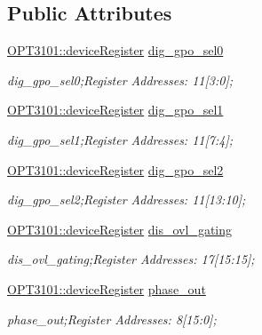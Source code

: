\subsection*{Public Attributes}
\begin{DoxyCompactItemize}
\item 
\mbox{\hyperlink{class_o_p_t3101_1_1device_register}{O\+P\+T3101\+::device\+Register}} \mbox{\hyperlink{class_o_p_t3101_1_1registers_a524961a20bb991dfedd371ad04106acb}{dig\+\_\+gpo\+\_\+sel0}}
\begin{DoxyCompactList}\small\item\em dig\+\_\+gpo\+\_\+sel0;Register Addresses\+: 11\mbox{[}3\+:0\mbox{]}; \end{DoxyCompactList}\item 
\mbox{\hyperlink{class_o_p_t3101_1_1device_register}{O\+P\+T3101\+::device\+Register}} \mbox{\hyperlink{class_o_p_t3101_1_1registers_aa4838268aa3b89fbd6e03d9f132072bb}{dig\+\_\+gpo\+\_\+sel1}}
\begin{DoxyCompactList}\small\item\em dig\+\_\+gpo\+\_\+sel1;Register Addresses\+: 11\mbox{[}7\+:4\mbox{]}; \end{DoxyCompactList}\item 
\mbox{\hyperlink{class_o_p_t3101_1_1device_register}{O\+P\+T3101\+::device\+Register}} \mbox{\hyperlink{class_o_p_t3101_1_1registers_a2274058727c99614f1eccf195ddccd6d}{dig\+\_\+gpo\+\_\+sel2}}
\begin{DoxyCompactList}\small\item\em dig\+\_\+gpo\+\_\+sel2;Register Addresses\+: 11\mbox{[}13\+:10\mbox{]}; \end{DoxyCompactList}\item 
\mbox{\hyperlink{class_o_p_t3101_1_1device_register}{O\+P\+T3101\+::device\+Register}} \mbox{\hyperlink{class_o_p_t3101_1_1registers_a258c4f416a6c31685b3e66f1d75921e7}{dis\+\_\+ovl\+\_\+gating}}
\begin{DoxyCompactList}\small\item\em dis\+\_\+ovl\+\_\+gating;Register Addresses\+: 17\mbox{[}15\+:15\mbox{]}; \end{DoxyCompactList}\item 
\mbox{\hyperlink{class_o_p_t3101_1_1device_register}{O\+P\+T3101\+::device\+Register}} \mbox{\hyperlink{class_o_p_t3101_1_1registers_a0b410cb503df506724a4b6a1da49ce1e}{phase\+\_\+out}}
\begin{DoxyCompactList}\small\item\em phase\+\_\+out;Register Addresses\+: 8\mbox{[}15\+:0\mbox{]}; \end{DoxyCompactList}\item 

\end{DoxyCompactItemize}
